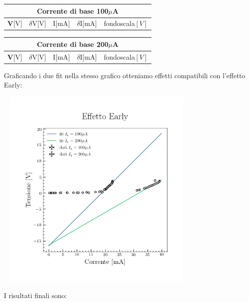\documentclass{amsart}
\begin{document}
    \begin{center}
        \begin{tabular}{|p{1cm}|p{1cm}|p{1cm}|p{1cm}|p{2cm}|}
            \hline
            \multicolumn{5}{|c|}{Corrente di base 100$\mu$A}\\
            \hline
            \textbf V[V] & $\delta$V[V] & I[mA] & $\delta$I[mA] & fondoscala$[V]$ \\
            \hline
            
            \hline      
        \end{tabular}
        \hspace{1cm}
        \begin{tabular}{|p{1cm}|p{1cm}|p{1cm}|p{1cm}|p{2cm}|}
            \hline
            \multicolumn{5}{|c|}{Corrente di base 200$\mu$A}\\
            \hline
            \textbf V[V] & $\delta$V[V] & I[mA] & $\delta$I[mA]  & fondoscala$[V]$ \\
            \hline
            
            \hline
        \end{tabular}
    \end{center}
    Graficando i due fit nella stesso grafico otteniamo effetti compatibili con l'effetto Early: \\
    \begin{center}
        \includegraphics[width = 10cm, height = 10cm]{effetto_early.png}\\
    \end{center}
        \vspace{1cm}
    I risultati finali sono:\\
\end{document}
